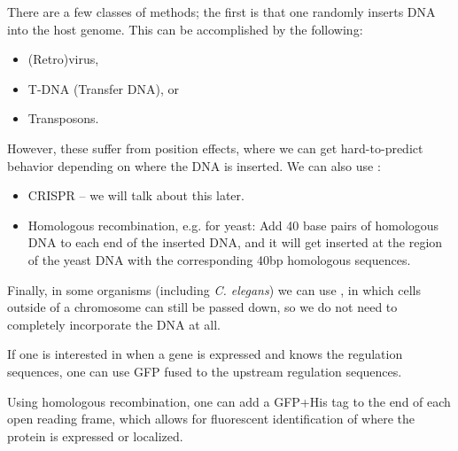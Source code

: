 \begin{exm}
	There are a few classes of methods; the first is that one randomly inserts DNA into the host genome. This can be accomplished by the following:
	\begin{itemize}
		\item (Retro)virus,
		\item T-DNA (Transfer DNA), or
		\item Transposons.
	\end{itemize}	
	However, these suffer from position effects, where we can get hard-to-predict behavior depending on where the DNA is inserted.
	We can also use :
	\begin{itemize}
		\item CRISPR -- we will talk about this later.
		\item Homologous recombination, e.g. for yeast: Add 40 base pairs of homologous DNA to each end of the inserted DNA, and it will get inserted at the region of the yeast DNA with the corresponding 40bp homologous sequences.
	\end{itemize}
	Finally, in some organisms (including \emph{C. elegans}) we can use , in which cells outside of a chromosome can still be passed down, so we do not need to completely incorporate the DNA at all. 
\end{exm}

\begin{exper}
	If one is interested in when a gene is expressed and knows the regulation sequences, one can use GFP fused to the upstream regulation sequences.
\end{exper}

\begin{exper}
	Using homologous recombination, one can add a GFP+His tag to the end of each open reading frame, which allows for fluorescent identification of where the protein is expressed or localized.
\end{exper}


